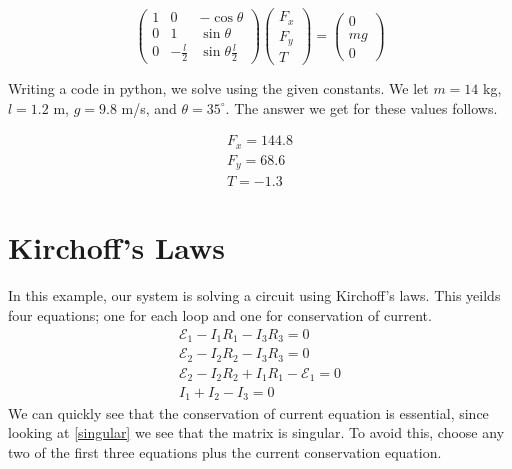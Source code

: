 \documentclass[11pt]{article}
\begin{document}
\begin{equation}
 \left( \begin{array}{ccc}
1 & 0 & - \cos \theta \\
0 & 1 & \sin \theta \\
0 & - \frac{l}{2} & \sin \theta \frac{l}{2} \end{array} \right)
 \left( \begin{array}{ccc}
F_x \\
F_y \\
T \end{array} \right) = 
 \left( \begin{array}{ccc}
0 \\
mg \\
0\end{array} \right)
\end{equation}

Writing a code in python, we solve using the given constants. We let $m = 14$ kg, $l = 1.2$ m, $g = 9.8$ m/s, and $\theta = 35^{\circ}$. The answer we get for these values follows. 

\begin{subequations}
\begin{align}
F_x = 144.8 \\
F_y = 68.6 \\
T = -1.3 
\end{align}
\end{subequations} 

\section{Kirchoff's Laws}
In this example, our system is solving a circuit using Kirchoff's laws. This yeilds four equations; one for each loop and one for conservation of current. 
\begin{subequations}
\begin{align}
\mathcal{E}_1 - I_1 R_1 - I_3 R_3 = 0 \\
\mathcal{E}_2 - I_2 R_2 - I_3 R_3 = 0\\
\mathcal{E}_2 - I_2 R_2 +I_1 R_1 - \mathcal{E}_1 = 0 \\
I_1 +I_2-I_3= 0
\end{align}
\end{subequations}
We can quickly see that the conservation of current equation is essential, since looking at \ref{singular} we see that the matrix is singular. To avoid this, choose any two of the first three equations plus the current conservation equation. 
\end{document}
